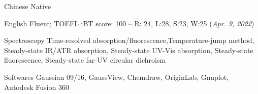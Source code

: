 


\begin{cvskills}


\cvskill
{Chinese} %
{Native} %


\cvskill
{English}
{Fluent; TOEFL iBT score: 100 -- R: 24, L:28, S:23, W:25 (\textit{Apr. 9, 2022})}

\end{cvskills}



\begin{cvskills}


\cvskill
{Spectroscopy} %
{Time-resolved absorption/fluorescence,Temperature-jump method, Steady-state IR/ATR absorption, Steady-state UV-Vis absorption, Steady-state fluorescence, Steady-state far-UV circular dichroism} %


\cvskill
{Softwares}
{Gaussian 09/16, GaussView, Chemdraw, OriginLab, Gnuplot, Autodesk Fusion 360}


\end{cvskills}


